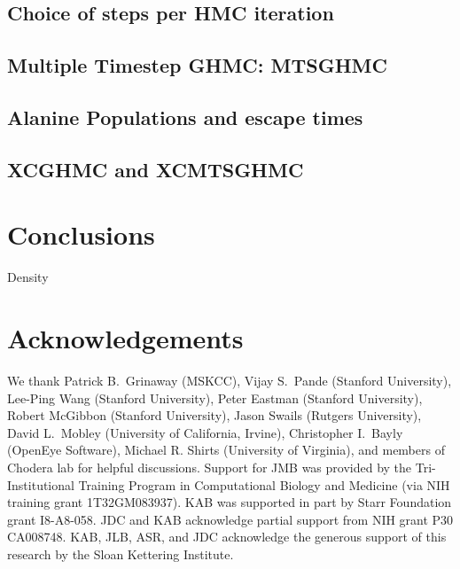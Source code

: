 \documentclass[aps,pre,twocolumn,nofootinbib,superscriptaddress,linenumbers]{revtex4-1}
\begin{document}
\subsection{Choice of steps per HMC iteration}

\subsection{Multiple Timestep GHMC: MTSGHMC}

\subsection{Alanine Populations and escape times}

\subsection{XCGHMC and XCMTSGHMC}




\section{Conclusions}

Density 


\section{Acknowledgements}

We thank Patrick B.~Grinaway (MSKCC), Vijay S.~Pande (Stanford University), Lee-Ping Wang (Stanford University), Peter Eastman (Stanford University), Robert McGibbon (Stanford University), Jason Swails (Rutgers University), David L.~Mobley (University of California, Irvine), Christopher I.~Bayly (OpenEye Software), Michael R. Shirts (University of Virginia), and members of Chodera lab for helpful discussions.  
Support for JMB was provided by the Tri-Institutional Training Program in Computational Biology and Medicine (via NIH training grant 1T32GM083937).  KAB was supported in part by Starr Foundation grant I8-A8-058.  JDC and KAB acknowledge partial support from NIH grant P30 CA008748.  KAB, JLB, ASR, and JDC acknowledge the generous support of this research by the Sloan Kettering Institute.



\end{document}
